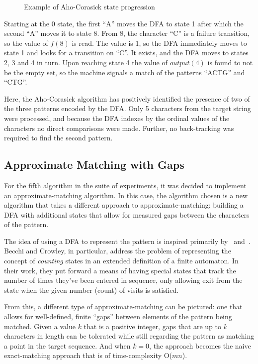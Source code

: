 \begin{figure}[ht]
\centering

\caption{Example of Aho-Corasick state progression}
\label{fig:ac_progression}
\end{figure}

Starting at the 0 state, the first ``A'' moves the DFA to state 1 after which the second ``A'' moves it to state 8. From 8, the character ``C'' is a failure transition, so the value of $f(8)$ is read. The value is 1, so the DFA immediately moves to state 1 and looks for a transition on ``C''. It exists, and the DFA moves to states 2, 3 and 4 in turn. Upon reaching state 4 the value of $output(4)$ is found to not be the empty set, so the machine signals a match of the patterns ``ACTG'' and ``CTG''.

Here, the Aho-Corasick algorithm has positively identified the presence of two of the three patterns encoded by the DFA. Only 5 characters from the target string were processed, and because the DFA indexes by the ordinal values of the characters no direct comparisons were made. Further, no back-tracking was required to find the second pattern.

\subsection{Approximate Matching with Gaps}
\label{subsec:dfa_gap}

For the fifth algorithm in the suite of experiments, it was decided to implement an approximate-matching algorithm. In this case, the algorithm chosen is a new algorithm that takes a different approach to approximate-matching: building a DFA with additional states that allow for measured gaps between the characters of the pattern.

The idea of using a DFA to represent the pattern is inspired primarily by~\cite{aho} and~\cite{becchi}. Becchi and Crowley, in particular, address the problem of representing the concept of \textit{counting} states in an extended definition of a finite automaton. In their work, they put forward a means of having special states that track the number of times they've been entered in sequence, only allowing exit from the state when the given number (count) of visits is satisfied.

From this, a different type of approximate-matching can be pictured: one that allows for well-defined, finite ``gaps'' between elements of the pattern being matched. Given a value $k$ that is a positive integer, gaps that are up to $k$ characters in length can be tolerated while still regarding the pattern as matching a point in the target sequence. And when $k = 0$, the approach becomes the naive exact-matching approach that is of time-complexity O($mn$).

